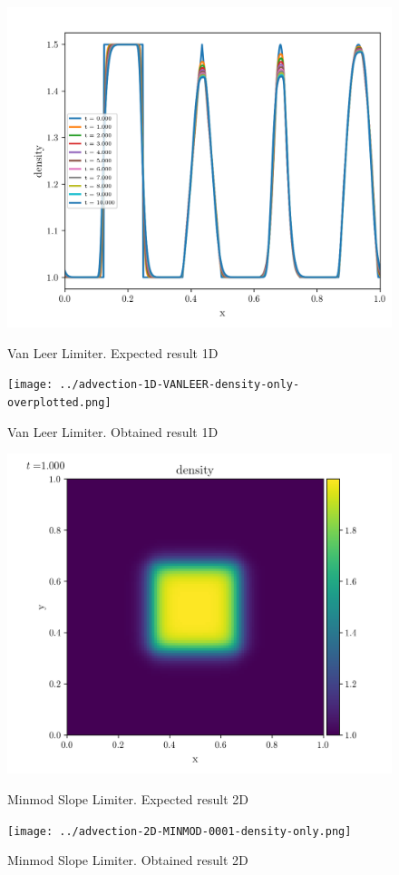     \begin{figure}[htbp]
        \centering
        \includegraphics[width=.7\textwidth]{./figures/advection-1D-VANLEER-density-only-overplotted.png}%
        \caption{Van Leer Limiter. Expected result 1D}
        \texttt{[image: ../advection-1D-VANLEER-density-only-overplotted.png]}%
        \caption{Van Leer Limiter. Obtained result 1D}
    \end{figure}





    \begin{figure}[htbp]
        \centering
        \includegraphics[width=.7\textwidth]{./figures/advection-2D-MINMOD-0001-density-only.png}%
        \caption{Minmod Slope Limiter. Expected result 2D}
        \texttt{[image: ../advection-2D-MINMOD-0001-density-only.png]}%
        \caption{Minmod Slope Limiter. Obtained result 2D}
    \end{figure}

